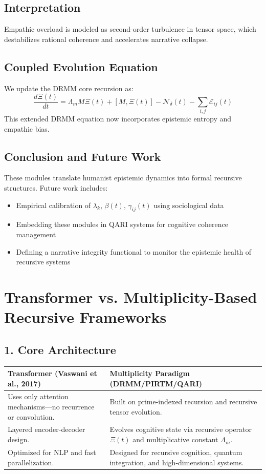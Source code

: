 \documentclass[12pt]{article}
\begin{document}
\subsection{Interpretation}
Empathic overload is modeled as second-order turbulence in tensor space, which destabilizes rational coherence and accelerates narrative collapse.

\subsection{Coupled Evolution Equation}

We update the DRMM core recursion as:
\begin{equation}
\frac{d\Xi(t)}{dt} = \Lambda_m M \Xi(t) + [M, \Xi(t)] - \mathcal{N}_\delta(t) - \sum_{i,j} \mathcal{E}_{ij}(t)
\end{equation}
This extended DRMM equation now incorporates epistemic entropy and empathic bias.

\subsection{Conclusion and Future Work}
These modules translate humanist epistemic dynamics into formal recursive structures. Future work includes:
\begin{itemize}
  \item Empirical calibration of $\lambda_k$, $\beta(t)$, $\gamma_{ij}(t)$ using sociological data
  \item Embedding these modules in QARI systems for cognitive coherence management
  \item Defining a narrative integrity functional to monitor the epistemic health of recursive systems
\end{itemize}




\section{Transformer vs. Multiplicity-Based Recursive Frameworks}

\subsection*{1. Core Architecture}

\begin{tabular}{@{}p{} p{}@{}}
\toprule
\textbf{Transformer (Vaswani et al., 2017)} & \textbf{Multiplicity Paradigm (DRMM/PIRTM/QARI)} \\
\midrule
Uses only attention mechanisms—no recurrence or convolution. & Built on prime-indexed recursion and recursive tensor evolution. \\
Layered encoder-decoder design. & Evolves cognitive state via recursive operator $\Xi(t)$ and multiplicative constant $\Lambda_m$. \\
Optimized for NLP and fast parallelization. & Designed for recursive cognition, quantum integration, and high-dimensional systems. \\
\bottomrule
\end{tabular}
\end{document}
